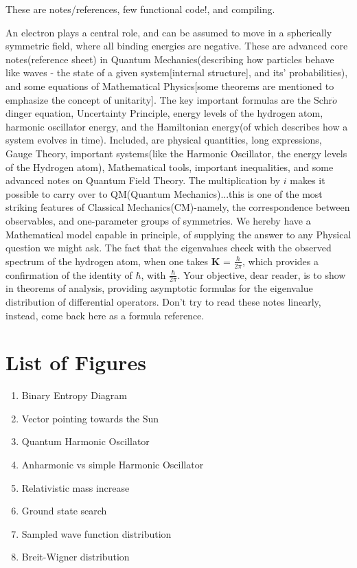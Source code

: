\documentclass[10pt,fancy]{elegantbook}
\begin{document}
These are notes/references, few functional code!, and compiling.


An electron plays a central role, and can be assumed to move in a spherically symmetric field, where all binding energies are negative. These are advanced core notes(reference sheet) in Quantum Mechanics(describing how particles behave like waves - 
the state of a given system[internal structure], and its' probabilities), 
and some equations of Mathematical Physics[some theorems are mentioned to emphasize the concept of unitarity].
The key important formulas are the Schr$\ddot{o}$dinger equation, 
Uncertainty Principle, energy levels of the hydrogen atom, harmonic oscillator energy,
and the Hamiltonian energy(of which describes how a system evolves in time). 
Included, are physical quantities, long expressions, Gauge Theory, 
important systems(like the Harmonic Oscillator, the energy levels of the Hydrogen atom), Mathematical tools, 
important inequalities, and some advanced notes on Quantum Field Theory. The multiplication by $i$ makes it possible
to carry over to QM(Quantum Mechanics)...this is one of the most striking features of Classical Mechanics(CM)-namely,
the correspondence between observables, and one-parameter groups of symmetries. We hereby have a Mathematical model
capable in principle, of supplying the answer to any Physical question we might ask. The fact that the eigenvalues check with
the observed spectrum of the hydrogen atom, when one takes $\mathbf K$ = $\frac{\hbar}{2 \pi}$, which provides a confirmation
of the identity of $\hbar$, with $\frac{\hbar}{2 \pi}$. Your objective, dear reader, is to show in theorems of analysis, providing
asymptotic formulas for the eigenvalue distribution of differential operators.                                                                      
Don't try to read these notes linearly, instead, come back here as a formula reference. \\


\section{List of Figures}

\begin{enumerate}

\item Binary Entropy Diagram
\item Vector pointing towards the Sun
\item Quantum Harmonic Oscillator
\item Anharmonic vs simple Harmonic Oscillator
\item Relativistic mass increase  
\item Ground state search
\item Sampled wave function distribution
\item Breit-Wigner distribution

\end{enumerate}
\end{document}
